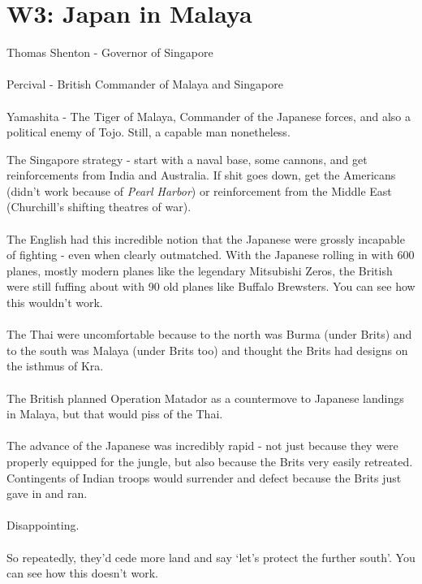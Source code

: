 \documentclass[a4paper]{article}
\begin{document}
\section{W3: Japan in Malaya}
\begin{displayquote}
	Thomas Shenton - Governor of Singapore\\
	\\
	Percival - British Commander of Malaya and Singapore\\
	\\
	Yamashita - The Tiger of Malaya, Commander of the Japanese forces, and also a political enemy of Tojo. Still, a capable man nonetheless.
\end{displayquote}
The Singapore strategy - start with a naval base, some cannons, and get reinforcements from India and Australia. If shit goes down, get the Americans (didn't work because of \textit{Pearl Harbor}) or reinforcement from the Middle East (Churchill's shifting theatres of war).\\ 
\\
The English had this incredible notion that the Japanese were grossly incapable of fighting - even when clearly outmatched. With the Japanese rolling in with 600 planes, mostly modern planes like the legendary Mitsubishi Zeros, the British were still fuffing about with 90 old planes like Buffalo Brewsters. You can see how this wouldn't work.\\
\\
The Thai were uncomfortable because to the north was Burma (under Brits) and to the south was Malaya (under Brits too) and thought the Brits had designs on the isthmus of Kra.\\
\\
The British planned Operation Matador as a countermove to Japanese landings in Malaya, but that would piss of the Thai.\\
\\
The advance of the Japanese was incredibly rapid - not just because they were properly equipped for the jungle, but also because the Brits very easily retreated. Contingents of Indian troops would surrender and defect because the Brits just gave in and ran.\\
\\
Disappointing.\\
\\
So repeatedly, they'd cede more land and say `let's protect the further south'. You can see how this doesn't work.
\end{document}
